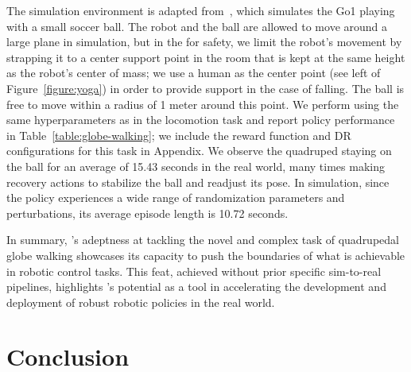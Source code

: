 \documentclass[conference]{IEEEtran}
\begin{document}
The simulation environment is adapted from~\citet{ji2023dribblebot}, which simulates the Go1 playing with a small soccer ball. The robot and the ball are allowed to move around a large plane in simulation, but in the  for safety, we limit the robot's movement by strapping it to a center support point in the room that is kept at the same height as the robot's center of mass; we use a human as the center point (see left of Figure~\ref{figure:yoga}) in order to provide support in the case of falling. The ball is free to move within a radius of 1 meter around this point. We perform \ourmethod using the same hyperparameters as in the locomotion task and report policy performance in Table~\ref{table:globe-walking}; we include the \ourmethod reward function and DR configurations for this task in Appendix. We observe the quadruped staying on the ball for an average of 15.43 seconds in the real world, many times making recovery actions to stabilize the ball and readjust its pose. In simulation, since the policy experiences a wide range of randomization parameters and perturbations, its average episode length is 10.72 seconds.


 In summary, \ourmethod's adeptness at tackling the novel and complex task of quadrupedal globe walking showcases its capacity to push the boundaries of what is achievable in robotic control tasks. This feat, achieved without prior specific sim-to-real pipelines, highlights \ourmethod's potential as a  tool in accelerating the development and deployment of robust robotic policies in the real world.

\section{Conclusion} 
\label{sec:conclusion}
\end{document}
